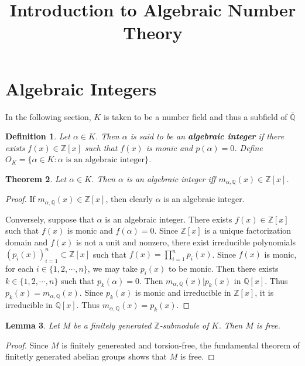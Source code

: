 \documentclass[12pt]{amsart}
\newtheorem{thm}{Theorem}[section]
\newtheorem{lem}[thm]{Lemma}
\newtheorem{defn}[thm]{Definition}
\newcommand{\al}{\alpha}
\newcommand{\Z}{\mathbb{Z}}
\newcommand{\Q}{\mathbb{Q}}
\begin{document}
\title{Introduction to Algebraic Number Theory}
\maketitle

\tableofcontents

\section{Algebraic Integers}

In the following section, $K$ is taken to be a number field and thus a subfield of $\overline{\Q}$

\begin{defn}
Let $\al \in K$. Then $\al$ is said to be an \textbf{algebraic integer} if there exists $f(x) \in \Z[x]$ such that $f(x)$ is monic and $p(\al) = 0$. Define $O_K = \{\al \in K: \al \text{ is an algebraic integer}\}$.
\end{defn}

\begin{thm}
Let $\al \in K$. Then $\al$ is an algebraic integer iff $m_{\al, \Q}(x) \in \Z[x]$.
\end{thm}

\begin{proof}
If $m_{\al, \Q}(x) \in \Z[x]$, then clearly $\al$ is an algebraic integer.\vspace{2mm}

Conversely, suppose that $\al$ is an algebraic integer. There exists $f(x) \in \Z[x]$ such that $f(x)$ is monic and $f(\al)=0$. Since $\Z[x]$ is a unique factorization domain and $f(x)$ is not a unit and nonzero, there exist irreducible polynomials $(p_i(x))_{i=1}^n \subset \Z[x]$ such that $f(x) = \prod\limits_{i=1}^np_i(x)$. Since $f(x)$ is monic, for each $i \in \{1,2,\cdots,n\}$, we may take $p_i(x)$ to be monic. Then there exists $k \in \{1,2,\cdots,n\}$ such that $p_k(\al)=0$. Then $m_{\al, \Q}(x)|p_k(x)$ in $\Q[x]$. Thus $p_k(x)=m_{\al, \Q}(x)$. Since $p_k(x)$ is monic and irreducible in $\Z[x]$, it is irreducible in $\Q[x]$. Thus $m_{\al, \Q}(x)=p_k(x)$. 
\end{proof} 

\begin{lem}
Let $M$ be a finitely generated $\Z$-submodule of $K$. Then $M$ is free. 
\end{lem}

\begin{proof}
Since $M$ is finitely genereated and torsion-free, the fundamental theorem of finitetly generated abelian groups shows that $M$ is free.
\end{proof}
\end{document}
